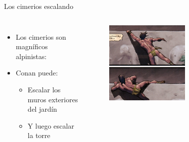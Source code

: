 \begin{frame}{Los cimerios escalando}
  \begin{columns}
    \begin{itemize}
      \item Los cimerios son magníficos alpinistas:
      \item Conan puede:
      \begin{itemize}
        \item Escalar los muros exteriores del jardín
        \item Y luego escalar la torre
      \end{itemize}
    \end{itemize}
    \begin{figure}[htb]
      \centering
      \includegraphics[width=0.6\textwidth]{img/tropes/escalando}
    \end{figure}
  \end{columns}
\end{frame}
\note{

}

